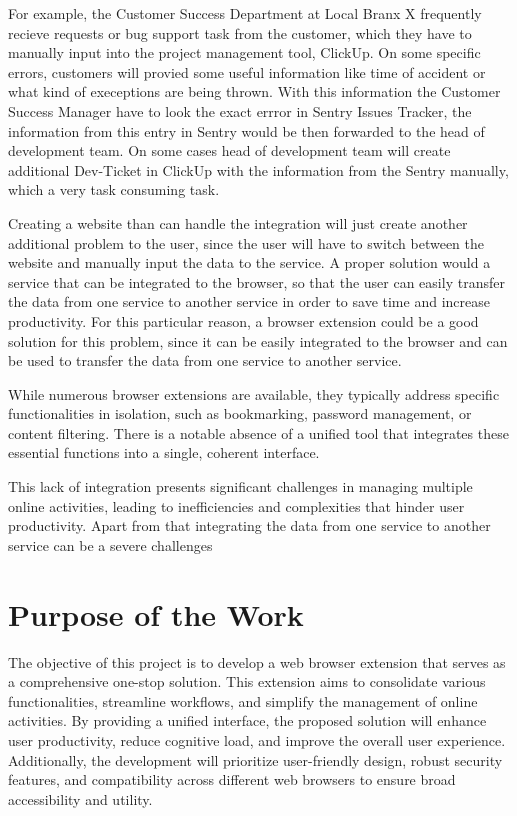 For example, the Customer Success Department at Local Branx X frequently recieve requests or bug support task from the customer, which they have to manually input into the project management tool, ClickUp. On some specific errors, customers will provied some useful information like time of accident or what kind of execeptions are being thrown. With this information the Customer Success Manager have to look the exact errror in Sentry Issues Tracker, the information from this entry in Sentry would be then forwarded to the head of development team. On some cases head of development team will create additional Dev-Ticket in ClickUp with the information from the Sentry manually, which a very task consuming task.

Creating a website than can handle the integration will just create another additional problem to the user, since the user will have to switch between the website and manually input the data to the service. A proper solution would a service that can be integrated to the browser, so that the user can easily transfer the data from one service to another service in order to save time and increase productivity. For this particular reason, a browser extension could be a good solution for this problem, since it can be easily integrated to the browser and can be used to transfer the data from one service to another service.

While numerous browser extensions are available, they typically address specific functionalities in isolation, such as bookmarking, password management, or content filtering. There is a notable absence of a unified tool that integrates these essential functions into a single, coherent interface. 

This lack of integration presents significant challenges in managing multiple online activities, leading to inefficiencies and complexities that hinder user productivity. Apart from that integrating the data from one service to another service can be a severe challenges

%
%
\section{Purpose of the Work}
\label{sec:intro:goal}

The objective of this project is to develop a web browser extension that serves as a comprehensive one-stop solution. This extension aims to consolidate various functionalities, streamline workflows, and simplify the management of online activities. By providing a unified interface, the proposed solution will enhance user productivity, reduce cognitive load, and improve the overall user experience. Additionally, the development will prioritize user-friendly design, robust security features, and compatibility across different web browsers to ensure broad accessibility and utility.

